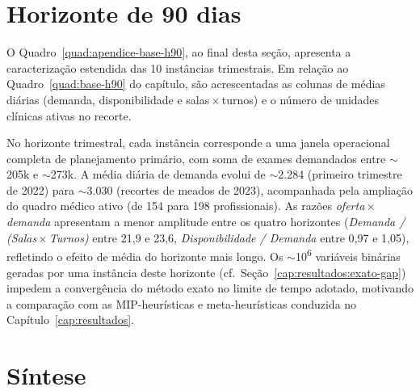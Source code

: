 \begingroup\let\cleardoublepage\clearpage
\begin{sidewaysquadro}[p]
	\centering
	\caption{Caracterização estendida das 10 instâncias do horizonte de 60 dias.}
	
	\label{quad:apendice-base-h60}
	\fautor
\end{sidewaysquadro}
\endgroup

\clearpage

\section{Horizonte de 90 dias}
\label{apendice:base-h90}

O Quadro~\ref{quad:apendice-base-h90}, ao final desta seção, apresenta a caracterização estendida das 10 instâncias trimestrais. Em relação ao Quadro~\ref{quad:base-h90} do capítulo, são acrescentadas as colunas de médias diárias (demanda, disponibilidade e salas\,$\times$\,turnos) e o número de unidades clínicas ativas no recorte.

\noindent No horizonte trimestral, cada instância corresponde a uma janela operacional completa de planejamento primário, com soma de exames demandados entre $\sim$205k e $\sim$273k. A média diária de demanda evolui de $\sim$2.284 (primeiro trimestre de 2022) para $\sim$3.030 (recortes de meados de 2023), acompanhada pela ampliação do quadro médico ativo (de 154 para 198 profissionais). As razões \emph{oferta\,$\times$\,demanda} apresentam a menor amplitude entre os quatro horizontes (\emph{Demanda / (Salas\,$\times$\,Turnos)} entre 21{,}9 e 23{,}6, \emph{Disponibilidade / Demanda} entre 0{,}97 e 1{,}05), refletindo o efeito de média do horizonte mais longo. Os $\sim$10\textsuperscript{6} variáveis binárias geradas por uma instância deste horizonte (cf.~Seção~\ref{cap:resultados:exato-gap}) impedem a convergência do método exato no limite de tempo adotado, motivando a comparação com as MIP-heurísticas e meta-heurísticas conduzida no Capítulo~\ref{cap:resultados}.

\begingroup\let\cleardoublepage\clearpage
\begin{sidewaysquadro}[p]
	\centering
	\caption{Caracterização estendida das 10 instâncias do horizonte de 90 dias.}
	
	\label{quad:apendice-base-h90}
	\fautor
\end{sidewaysquadro}
\endgroup

\clearpage

\section{Síntese}
\label{apendice:base-sintese}

